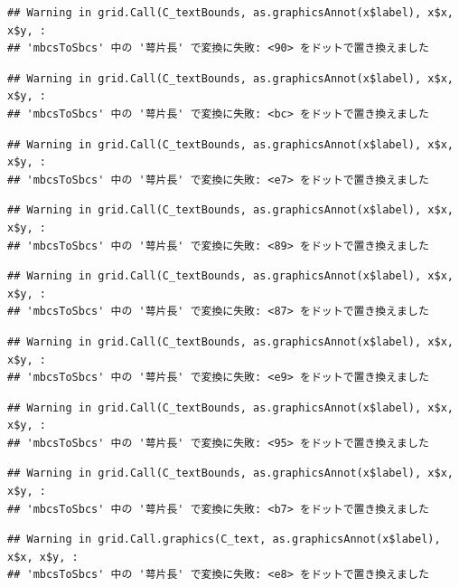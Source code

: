 \documentclass[
]{book}
\begin{document}
\begin{verbatim}
## Warning in grid.Call(C_textBounds, as.graphicsAnnot(x$label), x$x, x$y, :
## 'mbcsToSbcs' 中の '萼片長' で変換に失敗: <90> をドットで置き換えました
\end{verbatim}

\begin{verbatim}
## Warning in grid.Call(C_textBounds, as.graphicsAnnot(x$label), x$x, x$y, :
## 'mbcsToSbcs' 中の '萼片長' で変換に失敗: <bc> をドットで置き換えました
\end{verbatim}

\begin{verbatim}
## Warning in grid.Call(C_textBounds, as.graphicsAnnot(x$label), x$x, x$y, :
## 'mbcsToSbcs' 中の '萼片長' で変換に失敗: <e7> をドットで置き換えました
\end{verbatim}

\begin{verbatim}
## Warning in grid.Call(C_textBounds, as.graphicsAnnot(x$label), x$x, x$y, :
## 'mbcsToSbcs' 中の '萼片長' で変換に失敗: <89> をドットで置き換えました
\end{verbatim}

\begin{verbatim}
## Warning in grid.Call(C_textBounds, as.graphicsAnnot(x$label), x$x, x$y, :
## 'mbcsToSbcs' 中の '萼片長' で変換に失敗: <87> をドットで置き換えました
\end{verbatim}

\begin{verbatim}
## Warning in grid.Call(C_textBounds, as.graphicsAnnot(x$label), x$x, x$y, :
## 'mbcsToSbcs' 中の '萼片長' で変換に失敗: <e9> をドットで置き換えました
\end{verbatim}

\begin{verbatim}
## Warning in grid.Call(C_textBounds, as.graphicsAnnot(x$label), x$x, x$y, :
## 'mbcsToSbcs' 中の '萼片長' で変換に失敗: <95> をドットで置き換えました
\end{verbatim}

\begin{verbatim}
## Warning in grid.Call(C_textBounds, as.graphicsAnnot(x$label), x$x, x$y, :
## 'mbcsToSbcs' 中の '萼片長' で変換に失敗: <b7> をドットで置き換えました
\end{verbatim}

\begin{verbatim}
## Warning in grid.Call.graphics(C_text, as.graphicsAnnot(x$label), x$x, x$y, :
## 'mbcsToSbcs' 中の '萼片長' で変換に失敗: <e8> をドットで置き換えました
\end{verbatim}
\end{document}
